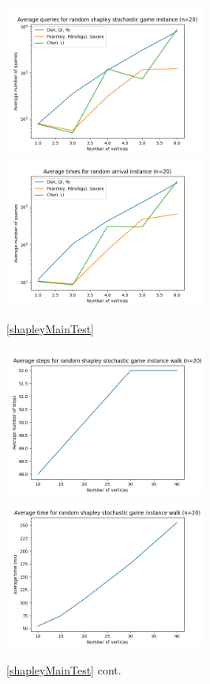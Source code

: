   \vspace{-20pt}
  \begin{figure}[H]
      \centering
      \includegraphics[width=2.6in]{plots/shapley_queries.png}
      \centering
      \includegraphics[width=2.6in]{plots/shapley_time.png}
      \caption{\cref{shapleyMainTest}} \label{shapleyMainPlot}
  \end{figure}
  \vspace{-20pt}
  \begin{figure}[H]
      \centering
      \includegraphics[width=2.6in]{plots/shapley_steps.png}
      \centering
      \includegraphics[width=2.6in]{plots/shapley_wtime.png}
      \caption{\cref{shapleyMainTest} cont.} \label{shapleyWalkPlot}
  \end{figure}
